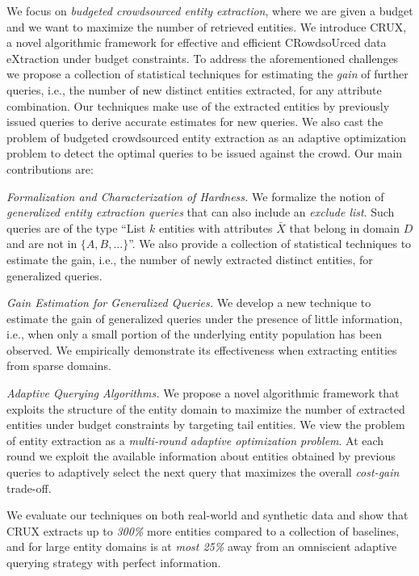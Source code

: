 We focus on {\em budgeted crowdsourced entity extraction}, where we are given a budget and we want to maximize the number of retrieved entities. We introduce CRUX, a novel algorithmic framework for effective and efficient CRowdsoUrced data eXtraction under budget constraints. To address the aforementioned challenges we propose a collection of  statistical techniques for estimating the {\em gain} of further queries, i.e., the number of new distinct entities extracted, for any attribute combination. Our techniques make use of the extracted entities by previously issued queries to derive accurate estimates for new queries. We also cast the problem of budgeted crowdsourced entity extraction as an adaptive optimization problem to detect the optimal queries to be issued against the crowd. Our main contributions are:
\squishlist
\item {\em Formalization and Characterization of Hardness.} We formalize the notion of {\em generalized entity extraction queries} that can also include an {\em exclude list}. Such queries are of the type ``List $k$ entities with attributes $\bar{X}$ that belong in domain $D$ and are not in $\{A, B, ...\}$''.  We also provide a collection of statistical techniques to estimate the gain, i.e., the number of newly extracted distinct entities, for generalized queries. 
\item {\em Gain Estimation for Generalized Queries.}  We develop a new technique to estimate the gain of generalized queries under the presence of little information, i.e., when only a small portion of the underlying entity population has been observed. We empirically demonstrate its effectiveness when extracting entities from sparse domains.
\item {\em Adaptive Querying Algorithms.} We propose a novel algorithmic framework that exploits the structure of the entity domain to maximize the number of extracted entities under budget constraints by targeting tail entities. We view the problem of entity extraction as a {\em multi-round adaptive optimization problem}. At  each round we exploit the available information about entities obtained by previous queries to adaptively select the next query that maximizes the overall {\em cost-gain} trade-off.
\squishend

We evaluate our techniques on both real-world and synthetic data and show that CRUX extracts up to {\em 300\%} more entities compared to a collection of baselines, and for large entity domains is at {\em most 25\%} away from an omniscient adaptive querying strategy with perfect information.

